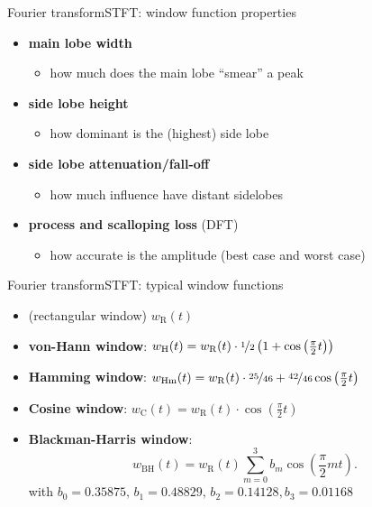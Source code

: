 	\begin{frame}{Fourier transform}{STFT: window function properties}
		\begin{itemize}
			\item	\textbf{main lobe width}
                \begin{itemize}
                    \item   how much does the main lobe ``smear'' a peak
                \end{itemize}
            \pause
			\item	\textbf{side lobe height}
                \begin{itemize}
                    \item   how dominant is the (highest) side lobe
                \end{itemize}
			\pause
            \item	\textbf{side lobe attenuation/fall-off}
                \begin{itemize}
                    \item   how much influence have distant sidelobes
                \end{itemize}
            \item   \textbf{process and scalloping loss} (DFT)
                \begin{itemize}
                    \item   how accurate is the amplitude (best case and worst case)
                \end{itemize}
		\end{itemize}
	\end{frame}	

	\begin{frame}{Fourier transform}{STFT: typical window functions}
        \begin{itemize}
            \item   (rectangular window) $w_\mathrm{R}(t)$
            \smallskip
            \item   \textbf{von-Hann window}: $w_\mathrm{H}(t) = w_\mathrm{R}(t)\cdot\nicefrac{1}{2}\left(1 + \cos\left(\frac{\pi}{2}t\right) \right)$
            \smallskip
            \item   \textbf{Hamming window}: $w_\mathrm{Hm}(t) = w_\mathrm{R}(t)\cdot\nicefrac{25}{46} + \nicefrac{42}{46}\cos\left(\frac{\pi}{2}t\right)$
            \smallskip
            \item   \textbf{Cosine window}: $w_\mathrm{C}(t) = w_\mathrm{R}(t)\cdot\cos\left(\frac{\pi}{2}t\right)$
            \smallskip
            \item   \textbf{Blackman-Harris window}:
                    \begin{equation*}
						w_\mathrm{BH}(t) = w_{\mathrm{R}}(t)\sum\limits_{m=0}^{3}{b_m\cos\left(\frac{\pi}{2}mt\right)} .
					\end{equation*}
                    with $b_0 = 0.35875,\, b_1 = 0.48829,\, b_2 = 0.14128, b_3 = 0.01168$
        \end{itemize}
	\end{frame}	

